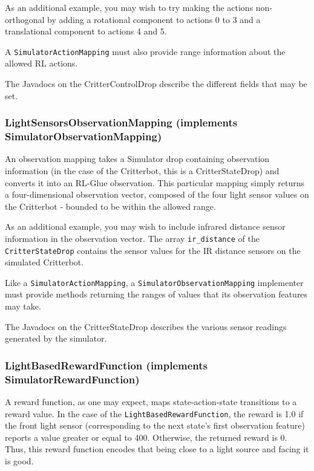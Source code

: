\documentclass[12pt]{article}
\newcommand{\code}[1]{\texttt{#1}}
\begin{document}
As an additional example, you may wish to try making the actions 
non-orthogonal by adding a rotational component to actions 0 to 3 and a
translational component to actions 4 and 5.

A \code{SimulatorActionMapping} must also provide range information about the
allowed RL actions. 

The Javadocs on the CritterControlDrop describe the different fields
that may be set.

\subsubsection[LightSensorsObservationMapping]{LightSensorsObservationMapping (implements SimulatorObservationMapping)}

An observation mapping takes a Simulator drop containing observation 
information (in the case of the Critterbot, this is a CritterStateDrop)
and converts it into an RL-Glue observation.  This particular mapping simply
returns a four-dimensional observation vector, composed of the four light
sensor values on the Critterbot - bounded to be within the allowed range.

As an additional example, you may wish to include infrared distance sensor
information in the observation vector. The array \verb+ir_distance+ of the
\code{CritterStateDrop} contains the sensor values for the IR distance
sensors on the simulated Critterbot.

Like a \code{SimulatorActionMapping}, a \code{SimulatorObservationMapping}
implementer must provide methods returning the ranges of values that its
observation features may take.

The Javadocs on the CritterStateDrop describes the various sensor readings
generated by the simulator.

\subsubsection[LightBasedRewardFunction]{LightBasedRewardFunction (implements SimulatorRewardFunction)}

A reward function, as one may expect, maps state-action-state transitions to
a reward value. In the case of the \code{LightBasedRewardFunction}, the 
reward is 1.0 if the front light sensor (corresponding to the next state's
first observation feature) reports a value greater or equal to 400. Otherwise,
the returned reward is 0. Thus, this reward function encodes that being close
to a light source and facing it is good.
\end{document}
